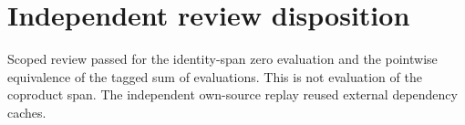\section*{Independent review disposition}
Scoped review passed for the identity-span zero evaluation and the pointwise equivalence of the tagged sum of evaluations. This is not evaluation of the coproduct span. The independent own-source replay reused external dependency caches.
